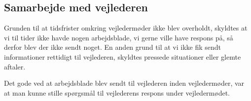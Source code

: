 \subsection{Samarbejde med vejlederen}

Grunden til at tidsfrister omkring vejledermøder ikke blev overholdt, skyldtes at vi til tider ikke havde nogen arbejdsblade, vi gerne ville have respons på, så derfor blev der ikke sendt noget. En anden grund til at vi ikke fik sendt informationer rettidigt til vejlederen, skyldtes pressede situationer eller glemte aftaler.

Det gode ved at arbejdsblade blev sendt til vejlederen inden vejledermøder, var at man kunne stille spørgsmål til vejlederens respons under vejledermødet.